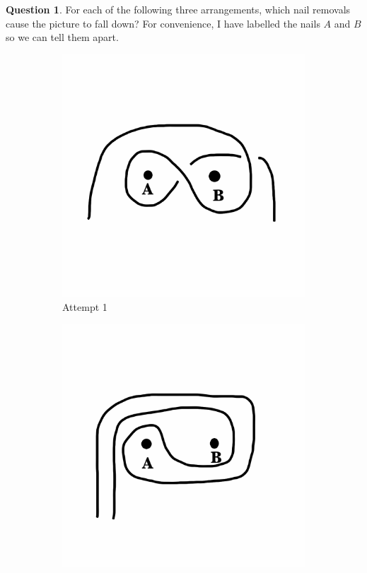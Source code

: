\documentclass[12pt,letterpaper]{article}
\theoremstyle{definition}
\newtheorem{question}{Question}
\begin{document}
\begin{question}
For each of the following three arrangements, which nail removals cause the picture to fall down?
For convenience, I have labelled the nails $A$ and $B$ so we can tell them apart.
\begin{figure}[h!]
    \centering
    \begin{subfigure}[b]{0.3\textwidth}
        \centering
        \includegraphics[width=\textwidth]{rgp01pics/attempt1.png}
        \caption{Attempt 1}
    \end{subfigure}
    \begin{subfigure}[b]{0.3\textwidth}
        \centering
        \includegraphics[width=\textwidth]{rgp01pics/attempt2.png}

\end{subfigure}
\end{figure}
\end{question}
\end{document}
